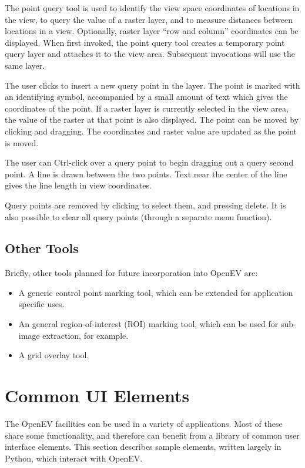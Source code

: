 \documentclass{openevreport}
\begin{document}
The point query tool is used to identify the view space coordinates of
locations in the view, to query the value of a raster layer, and to
measure distances between locations in a view.  Optionally, raster
layer ``row and column'' coordinates can be displayed.  When first
invoked, the point query tool creates a temporary point query layer
and attaches it to the view area.  Subsequent invocations will use the
same layer.

The user clicks to insert a new query point in the layer.  The point
is marked with an identifying symbol, accompanied by a small amount of 
text which gives the coordinates of the point.  If a raster layer is
currently selected in the view area, the value of the raster at that
point is also displayed.  The point can be moved by clicking and
dragging.  The coordinates and raster value are updated as the point
is moved.

The user can Ctrl-click over a query point to begin dragging out a
query second point.  A line is drawn between the two points.  Text
near the center of the line gives the line length in view
coordinates.

Query points are removed by clicking to select them, and pressing
delete.  It is also possible to clear all query points (through a
separate menu function).

\section{Other Tools}

Briefly, other tools planned for future incorporation into OpenEV are:
\begin{itemize}
\item A generic control point marking tool, which can be extended for
application specific uses.
\item An general region-of-interest (ROI) marking tool, which can be
used for sub-image extraction, for example.
\item A grid overlay tool.
\end{itemize}

\chapter{Common UI Elements}

The OpenEV facilities can be used in a variety of applications.  Most of
these share some functionality, and therefore can benefit from a
library of common user interface elements.  This section describes
sample elements, written largely in Python, which interact with OpenEV.
\end{document}
